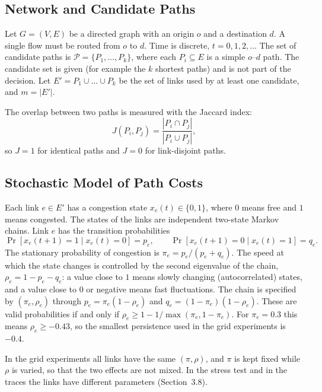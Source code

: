 \documentclass{amsart}
\newcommand{\abs}[1]{\left\lvert #1 \right\rvert}
\begin{document}
\subsection{Network and Candidate Paths}

Let $G = (V, E)$ be a directed graph with an origin $o$ and a destination $d$. A single flow must be routed from $o$ to $d$. Time is discrete, $t = 0, 1, 2, \dots$ The set of candidate paths is $\mathcal{P} = \{P_1, \dots, P_k\}$, where each $P_i \subseteq E$ is a simple $o$--$d$ path. The candidate set is given (for example the $k$ shortest paths) and is not part of the decision. Let $E' = P_1 \cup \dots \cup P_k$ be the set of links used by at least one candidate, and $m = \abs{E'}$.

The overlap between two paths is measured with the Jaccard index:
\begin{equation}
  J(P_i, P_j) = \frac{\abs{P_i \cap P_j}}{\abs{P_i \cup P_j}},
  \label{eq:jaccard}
\end{equation}
so $J = 1$ for identical paths and $J = 0$ for link-disjoint paths.

\subsection{Stochastic Model of Path Costs}

Each link $e \in E'$ has a congestion state $x_e(t) \in \{0, 1\}$, where $0$ means free and $1$ means congested. The states of the links are independent two-state Markov chains. Link $e$ has the transition probabilities
\begin{equation}
  \Pr[x_e(t+1) = 1 \mid x_e(t) = 0] = p_e, \qquad
  \Pr[x_e(t+1) = 0 \mid x_e(t) = 1] = q_e.
  \label{eq:markov}
\end{equation}
The stationary probability of congestion is $\pi_e = p_e/(p_e+q_e)$. The speed at which the state changes is controlled by the second eigenvalue of the chain, $\rho_e = 1 - p_e - q_e$: a value close to $1$ means slowly changing (autocorrelated) states, and a value close to $0$ or negative means fast fluctuations. The chain is specified by $(\pi_e, \rho_e)$ through $p_e = \pi_e (1-\rho_e)$ and $q_e = (1-\pi_e)(1-\rho_e)$. These are valid probabilities if and only if $\rho_e \ge 1 - 1/\max(\pi_e, 1-\pi_e)$. For $\pi_e = 0.3$ this means $\rho_e \ge -0.43$, so the smallest persistence used in the grid experiments is $-0.4$.

In the grid experiments all links have the same $(\pi, \rho)$, and $\pi$ is kept fixed while $\rho$ is varied, so that the two effects are not mixed. In the stress test and in the traces the links have different parameters (Section~3.8).
\end{document}
